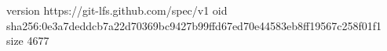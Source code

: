 version https://git-lfs.github.com/spec/v1
oid sha256:0e3a7deddcb7a22d70369bc9427b99ffd67ed70e44583eb8ff19567c258f01f1
size 4677
